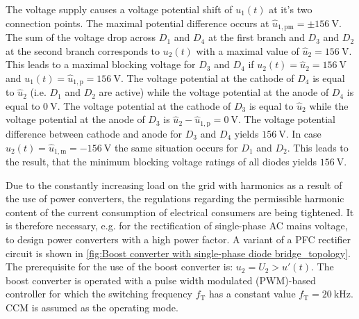 \begin{solutionblock}
\end{solutionblock}

\begin{solutionblock}
    The voltage supply causes a voltage  potential shift of $u_\mathrm{1}(t)$ at it's two connection points. 
    The maximal potential difference occurs at $\hat{u}_\mathrm{1,pm}=\pm \SI{156}{\volt}$.
    The sum of the voltage drop across $D_\mathrm{1}$ and $D_\mathrm{4}$ at the first branch and $D_\mathrm{3}$ and $D_\mathrm{2}$
    at the second branch corresponds to $u_\mathrm{2}(t)$ with a maximal value of $\hat{u}_\mathrm{2}=\SI{156}{\volt}$. 
    This leads to a maximal blocking voltage for $D_\mathrm{3}$ and $D_\mathrm{4}$ if $u_\mathrm{2}(t)=\hat{u}_\mathrm{2}=\SI{156}{\volt}$ 
    and $u_\mathrm{1}(t)=\hat{u}_\mathrm{1,p}=\SI{156}{\volt}$. The voltage potential at the cathode of $D_\mathrm{4}$ is equal to 
    $\hat{u}_\mathrm{2}$ (i.e. $D_\mathrm{1}$ and $D_\mathrm{2}$ are active) while the voltage potential
    at the anode of $D_\mathrm{4}$ is equal to $\SI{0}{\volt}$. The voltage potential at the cathode of $D_\mathrm{3}$ is equal to $\hat{u}_\mathrm{2}$
    while the voltage potential at the anode of $D_\mathrm{3}$ is $\hat{u}_\mathrm{2}-\hat{u}_\mathrm{1,p}=\SI{0}{\volt}$. 
    The voltage potential difference between cathode and anode for $D_\mathrm{3}$ and $D_\mathrm{4}$ yields $\SI{156}{\volt}$.
    In case $u_\mathrm{2}(t)=\hat{u}_\mathrm{1,m}=\SI{-156}{\volt}$ the same situation occurs for $D_\mathrm{1}$ and $D_\mathrm{2}$.
    This leads to the result, that the minimum blocking voltage ratings of all diodes yields $\SI{156}{\volt}$.
\end{solutionblock}

Due to the constantly increasing load on the grid with harmonics as a result of the use of power converters, the regulations regarding the permissible harmonic content of the current consumption of electrical consumers are being tightened. It is therefore necessary, e.g. for the rectification of single-phase AC mains voltage, to design power converters with a high power factor. 
A variant of a PFC rectifier circuit is shown in \autoref{fig:Boost converter with single-phase diode bridge_topology}. The prerequisite for the use of the boost converter is: $u_\mathrm{2} = U_\mathrm{2}>u'(t)$. The boost converter is operated with a pulse width modulated (PWM)-based controller for which the switching frequency $f_\mathrm{T}$ has a constant value $f_\mathrm{T} = \SI{20}{\kilo\hertz}$. CCM is assumed as the operating mode.


